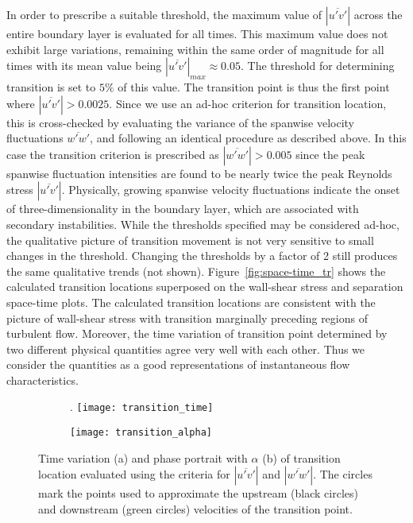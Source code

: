 In order to prescribe a suitable threshold, the maximum value of $|\overline{u'v'}|$ across the entire boundary layer is evaluated for all times. This maximum value does not exhibit large variations, remaining within the same order of magnitude for all times with its mean value being $|\overline{u'v'}|_{max}\approx0.05$. The threshold for determining transition is set to $5\%$ of this value. The transition point is thus the first point where $|\overline{u'v'}|>0.0025$. Since we use an ad-hoc criterion for transition location, this is cross-checked by evaluating the variance of the spanwise velocity fluctuations $\overline{w'w'}$, and following an identical procedure as described above. In this case the transition criterion is prescribed as $|\overline{w'w'}|>0.005$ since the peak spanwise fluctuation intensities are found to be nearly twice the peak Reynolds stress $|\overline{u'v'}|$. Physically, growing spanwise velocity fluctuations indicate the onset of three-dimensionality in the boundary layer, which are associated with secondary instabilities. While the thresholds specified may be considered ad-hoc, the qualitative picture of transition movement is not very sensitive to small changes in the threshold. Changing the thresholds by a factor of 2 still produces the same qualitative trends (not shown). Figure~\ref{fig:space-time_tr} shows the calculated transition locations superposed on the wall-shear stress and separation space-time plots. The calculated transition locations are consistent with the picture of wall-shear stress with transition marginally preceding regions of turbulent flow. Moreover, the time variation of transition point determined by two different physical quantities agree very well with each other. Thus we consider the quantities as a good representations of instantaneous flow characteristics.
\begin{figure}[h]
	\centering
	\begin{subfigure}[t]{0.45\textwidth}
		\centering
		\caption{}. 
		\texttt{[image: transition\_time]}
		\label{fig:transition_time}
	\end{subfigure}
	\begin{subfigure}[t]{0.45\textwidth}
		\centering
		\caption{} 		
		\texttt{[image: transition\_alpha]}
		\label{fig:transition_alpha}
	\end{subfigure}
	\caption{Time variation (a) and phase portrait with $\alpha$ (b) of transition location evaluated using the criteria for $|\overline{u'v'}|$ and $|\overline{w'w'}|$. The circles mark the points used to approximate the upstream (black circles) and downstream (green circles) velocities of the transition point.}
	\label{fig:transition}
\end{figure}

